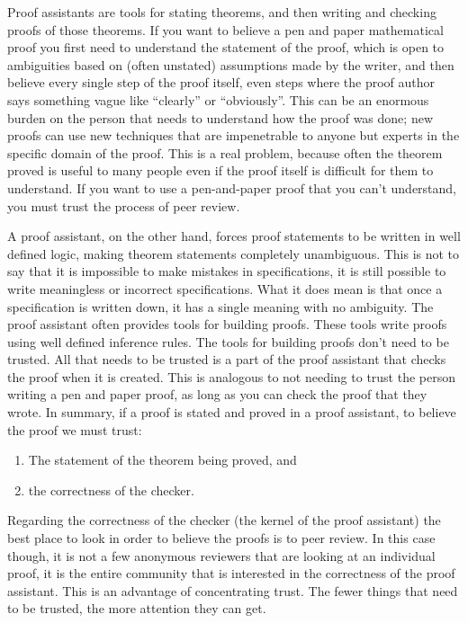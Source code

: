 \documentclass{puthesis}
\begin{document}
Proof assistants are tools for stating theorems, and then writing and
checking proofs of those theorems. If you want to believe a pen and
paper mathematical proof you first need to understand the statement of
the proof, which is open to ambiguities based on (often unstated)
assumptions made by the writer, and then believe every single step of
the proof itself, even steps where the proof author says something
vague like ``clearly'' or ``obviously''. This can be an enormous
burden on the person that needs to understand how the proof was done;
new proofs can use new techniques that are impenetrable to anyone but
experts in the specific domain of the proof. This is a real problem,
because often the theorem proved is useful to many people even if the
proof itself is difficult for them to understand. If you want to use a
pen-and-paper proof that you can't understand, you must trust the
process of peer review. 

A proof assistant, on the other hand, forces proof statements to be
written in well defined logic, making theorem statements completely
unambiguous. This is not to say that it is impossible to make mistakes
in specifications, it is still possible to write meaningless or
incorrect specifications. What it does mean is that once a
specification is written down, it has a single meaning with no
ambiguity.  The proof assistant often provides tools for building
proofs. These tools write proofs using well defined inference rules.
The tools for building proofs don't need to be trusted. All that needs
to be trusted is a part of the proof assistant that checks the proof
when it is created. This is analogous to not needing to trust the
person writing a pen and paper proof, as long as you can check the
proof that they wrote. In summary, if a proof is stated and proved in
a proof assistant, to believe the proof we must trust:

\begin{enumerate}
  \item The statement of the theorem being proved, and
  \item the correctness of the checker. 
\end{enumerate}

Regarding the correctness of the checker (the kernel of the proof
assistant) the best place to look in order to believe the proofs is to
peer review. In this case though, it is not a few anonymous reviewers
that are looking at an individual proof, it is the entire community
that is interested in the correctness of the proof assistant. This is
an advantage of concentrating trust. The fewer things that need to be
trusted, the more attention they can get.
\end{document}
